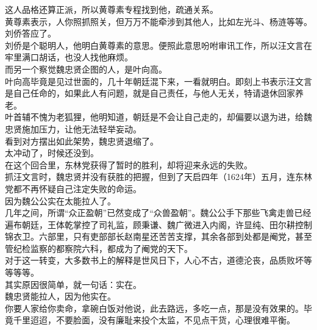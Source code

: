 \begin{multicols}{\theparacolNo}
这人品格还算正派，所以黄尊素专程找到他，疏通关系。\\

黄尊素表示，人你照抓照关，但万万不能牵涉到其他人，比如左光斗、杨涟等等。\\

刘侨答应了。\\

刘侨是个聪明人，他明白黄尊素的意思。便照此意思吩咐审讯工作，所以汪文言在牢里满口胡话，也没人找他麻烦。\\

而另一个察觉魏忠贤企图的人，是叶向高。\\

叶向高毕竟是见过世面的，几十年朝廷混下来，一看就明白。即刻上书表示汪文言是自己任命的，如果此人有问题，就是自己责任，与他人无关，特请退休回家养老。\\

叶首辅不愧为老狐狸，他明知道，朝廷是不会让自己走的，却偏要以退为进，给魏忠贤施加压力，让他无法轻举妄动。\\

看到对方摆出如此架势，魏忠贤退缩了。\\

太冲动了，时候还没到。\\

在这个回合里，东林党获得了暂时的胜利，却将迎来永远的失败。\\

抓汪文言时，魏忠贤并没有获胜的把握，但到了天启四年（1624年）五月，连东林党都不再怀疑自己注定失败的命运。\\

因为魏公公实在太能拉人了。\\

几年之间，所谓“众正盈朝”已然变成了“众兽盈朝”。魏公公手下那些飞禽走兽已经遍布朝廷，王体乾掌控了司礼监，顾秉谦、魏广微进入内阁，许显纯、田尔耕控制锦衣卫。六部里，只有吏部部长赵南星还苦苦支撑，其余各部到处都是阉党，甚至管纪检监察的都察院六科，都成为了阉党的天下。\\

对于这一转变，大多数书上的解释是世风日下，人心不古，道德沦丧，品质败坏等等等等。\\

其实原因很简单，就一句话：实在。\\

魏忠贤能拉人，因为他实在。\\

你要人家给你卖命，拿碗白饭对他说，此去路远，多吃一点，那是没有效果的。毕竟千里迢迢，不要脸面，没有廉耻来投个太监，不见点干货，心理很难平衡。\\


\end{multicols}
